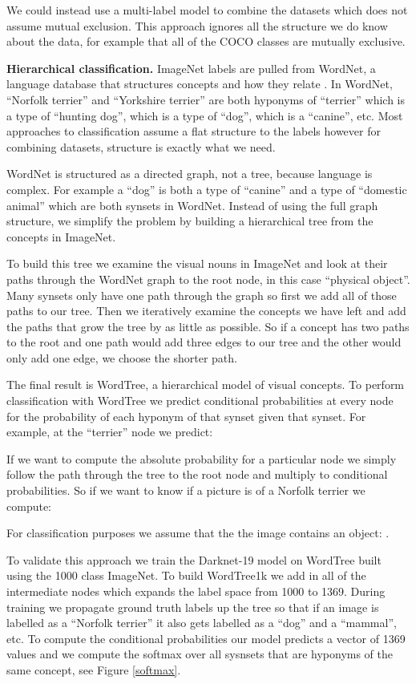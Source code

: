 \documentclass[10pt,twocolumn,letterpaper]{article}
\begin{document}
We could instead use a multi-label model to combine the datasets which does not assume mutual exclusion. This approach ignores all the structure we do know about the data, for example that all of the COCO classes are mutually exclusive.


\textbf{Hierarchical classification.} ImageNet labels are pulled from WordNet, a language database that structures concepts and how they relate \cite{wordnet}. In WordNet, ``Norfolk terrier'' and ``Yorkshire terrier'' are both hyponyms of ``terrier'' which is a type of ``hunting dog'', which is a type of ``dog'', which is a ``canine'', etc. Most approaches to classification assume a flat structure to the labels however for combining datasets, structure is exactly what we need.

WordNet is structured as a directed graph, not a tree, because language is complex. For example a ``dog'' is both a type of ``canine'' and a type of ``domestic animal'' which are both synsets in WordNet. Instead of using the full graph structure, we simplify the problem by building a hierarchical tree from the concepts in ImageNet.

To build this tree we examine the visual nouns in ImageNet and look at their paths through the WordNet graph to the root node, in this case ``physical object''. Many synsets only have one path through the graph so first we add all of those paths to our tree. Then we iteratively examine the concepts we have left and add the paths that grow the tree by as little as possible. So if a concept has two paths to the root and one path would add three edges to our tree and the other would only add one edge, we choose the shorter path.

The final result is WordTree, a hierarchical model of visual concepts. To perform classification with WordTree we predict conditional probabilities at every node for the probability of each hyponym of that synset given that synset. For example, at the ``terrier'' node we predict:



If we want to compute the absolute probability for a particular node we simply follow the path through the tree to the root node and multiply to conditional probabilities. So if we want to know if a picture is of a Norfolk terrier we compute:



For classification purposes we assume that the the image contains an object: . 

To validate this approach we train the Darknet-19 model on WordTree built using the 1000 class ImageNet. To build WordTree1k we add in all of the intermediate nodes which expands the label space from 1000 to 1369. During training we propagate ground truth labels up the tree so that if an image is labelled as a ``Norfolk terrier'' it also gets labelled as a ``dog'' and a ``mammal'', etc. To compute the conditional probabilities our model predicts a vector of 1369 values and we compute the softmax over all sysnsets that are hyponyms of the same concept, see Figure \ref{softmax}.
\end{document}
